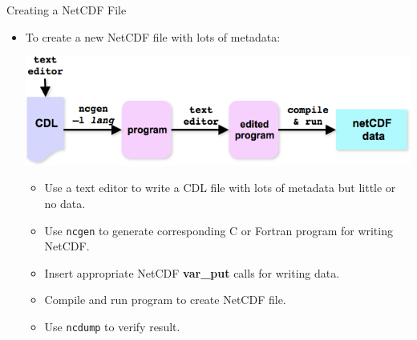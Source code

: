 \documentclass[compress,11pt,xcolor=svgnames,aspectratio=169]{beamer}
\begin{document}
\begin{frame}[fragile]{Creating a NetCDF File}

\begin{itemize}
  \item To create a new NetCDF file with lots of metadata:\\[0.3cm]

\begin{center}
\includegraphics[scale=0.5]{fig/nc-creat}
\end{center}

    \begin{itemize}
    \setlength\itemsep{0.1cm}
      \item Use a text editor to write a CDL file with lots of metadata but little or no data.
      \item Use \texttt{ncgen} to generate corresponding C or Fortran program for writing NetCDF.
      \item Insert appropriate NetCDF \textbf{var\_put} calls for writing data.
      \item Compile and run program to create NetCDF file.
      \item Use \texttt{ncdump} to verify result.
    \end{itemize}

\end{itemize}

\end{frame}
\end{document}
